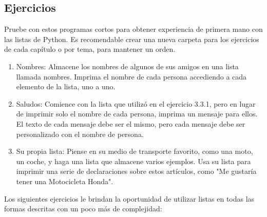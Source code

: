 \subsection{Ejercicios}\label{Tarea.4.2.8}

Pruebe con estos programas cortos para obtener experiencia de primera mano con las listas de Python.
Es recomendable crear una nueva carpeta para los ejercicios de cada capítulo o por tema, para mantener un orden.

\begin{enumerate}[4.2.8.1]
	
	\item Nombres: Almacene los nombres de algunos de sus amigos en una lista llamada nombres. Imprima el 
	nombre de cada persona accediendo a cada elemento de la lista, uno a uno.
	
	\item Saludos: Comience con la lista que utilizó en el ejercicio 3.3.1, pero en lugar de 
	imprimir solo el nombre de cada persona, imprima un mensaje para ellos. El texto de cada mensaje
	debe ser el mismo, pero cada mensaje debe ser personalizado con el nombre de persona.
	
	\item Su propia lista: Piense en su medio de transporte favorito, como una moto, un coche, y haga una 
	lista que almacene varios ejemplos. Usa su lista para imprimir una serie de declaraciones sobre estos artículos, como {}"{}Me gustaría tener una Motocicleta Honda{}"{}.
\end{enumerate}


Los siguientes ejercicios le brindan la oportunidad de utilizar listas en todas las formas descritas con un  poco más de complejidad:  


